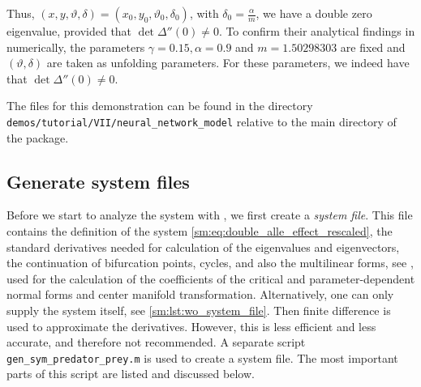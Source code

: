 Thus, $(x,y,\vartheta,\delta)=(x_0,y_0,\vartheta_0,\delta_0)$, with $\delta_0 =
\frac\alpha m$, we have a double zero eigenvalue, provided that
$\det\Delta''(0) \neq 0$. To confirm their analytical findings in \cite{Jiao2021}
numerically, the parameters $\gamma=0.15,\alpha=0.9$ and $m=1.50298303$ are
fixed and $(\vartheta,\delta)$ are taken as unfolding parameters. For these
parameters, we indeed have that $\det\Delta''(0) \neq 0$.

\begin{remark}
    The \MATLAB files for this demonstration can be found in the directory
    \texttt{demos/tutorial/VII/neural_network_model} relative to the main
    directory of the \DDEBIFTOOL package.
\end{remark}

\subsection{Generate system files}
Before we start to analyze the system with \DDEBIFTOOL, we first create a
\emph{system file}. This file contains the definition of the system
\cref{sm:eq:double_alle_effect_rescaled}, the standard derivatives needed for
calculation of the eigenvalues and eigenvectors, the continuation of
bifurcation points, cycles, and also the multilinear forms, see \cite[Section
6]{Switching2019}, used for the calculation of the coefficients of the critical
and parameter-dependent normal forms and center manifold transformation.
Alternatively, one can only supply the system itself, see
\cref{sm:lst:wo_system_file}. Then finite difference is used to approximate the
derivatives. However, this is less efficient and less accurate, and therefore not
recommended. A separate script \texttt{gen_sym_predator_prey.m} is used to
create a system file. The most important parts of this script are listed and
discussed below.

